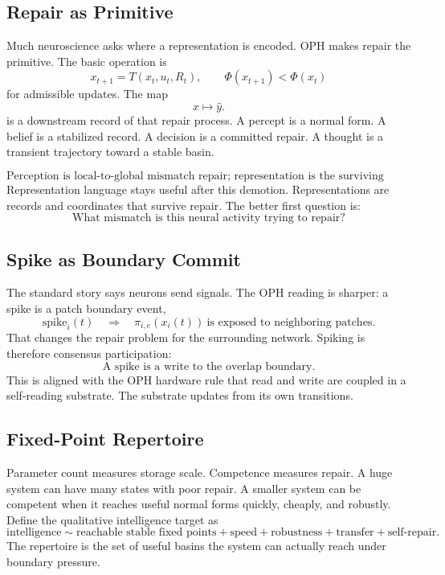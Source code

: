 \documentclass[11pt]{article}
\theoremstyle{remark}
\theoremstyle{plain}
\begin{document}
\subsection{Repair as Primitive}

Much neuroscience asks where a representation is encoded. OPH makes repair the primitive. The basic operation is
\[
x_{t+1}=T(x_t,u_t,R_t),
\qquad
\Phi(x_{t+1})<\Phi(x_t)
\]
for admissible updates. The map
\[
x\mapsto \hat y.
\]
is a downstream record of that repair process. A percept is a normal form. A belief is a stabilized record. A decision is a committed repair. A thought is a transient trajectory toward a stable basin.

\[
\boxed{
\text{Perception is local-to-global mismatch repair; representation is the surviving record.}
}
\]
Representation language stays useful after this demotion. Representations are records and coordinates that survive repair. The better first question is:
\[
\boxed{
\text{What mismatch is this neural activity trying to repair?}
}
\]

\subsection{Spike as Boundary Commit}

The standard story says neurons send signals. The OPH reading is sharper: a spike is a patch boundary event,
\[
\mathrm{spike}_i(t)
\quad\Longrightarrow\quad
\pi_{i,e}(x_i(t))\ \text{is exposed to neighboring patches}.
\]
That changes the repair problem for the surrounding network. Spiking is therefore consensus participation:
\[
\boxed{
\text{A spike is a write to the overlap boundary.}
}
\]
This is aligned with the OPH hardware rule that read and write are coupled in a self-reading substrate. The substrate updates from its own transitions.

\subsection{Fixed-Point Repertoire}

Parameter count measures storage scale. Competence measures repair. A huge system can have many states with poor repair. A smaller system can be competent when it reaches useful normal forms quickly, cheaply, and robustly. Define the qualitative intelligence target as
\[
\boxed{
\text{intelligence}
\sim
\text{reachable stable fixed points}
+
\text{speed}
+
\text{robustness}
+
\text{transfer}
+
\text{self-repair}.
}
\]
The repertoire is the set of useful basins the system can actually reach under boundary pressure.
\end{document}
